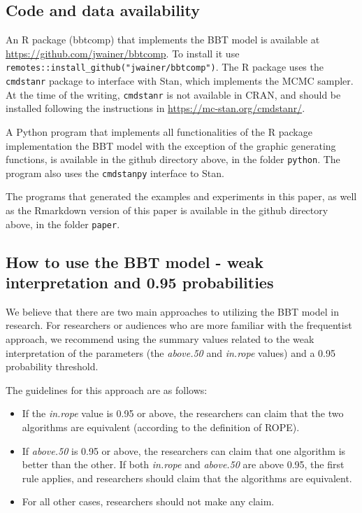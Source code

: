 \documentclass[twoside,11pt,preprint]{article}
\begin{document}
\hypertarget{code-and-data-availability}{%
\subsection{\texorpdfstring{Code and data availability \label{sec:code}}{Code and data availability }}\label{code-and-data-availability}}

An R package (bbtcomp) that implements the BBT model is available at
\url{https://github.com/jwainer/bbtcomp}. To install it use
\texttt{remotes::install\_github("jwainer/bbtcomp")}. The R package uses the
\texttt{cmdstanr} package to interface with Stan, which implements the MCMC
sampler. At the time of the writing, \texttt{cmdstanr} is not available in
CRAN, and should be installed following the instructions in
\url{https://mc-stan.org/cmdstanr/}.

A Python program that implements all functionalities of the R package
implementation the BBT model with the exception of the graphic
generating functions, is available in the github directory above, in
the folder \texttt{python}. The program also uses the \texttt{cmdstanpy} interface to Stan.

The programs that generated the examples and experiments in this paper, as
well as the Rmarkdown version of this paper is available in the github
directory above, in the folder \texttt{paper}.

\hypertarget{how-to-use-the-bbt-model---weak-interpretation-and-0.95-probabilities}{%
\subsection{How to use the BBT model - weak interpretation and 0.95 probabilities}\label{how-to-use-the-bbt-model---weak-interpretation-and-0.95-probabilities}}

We believe that there are two main approaches to utilizing the BBT model in research. For researchers or audiences who are more familiar with the frequentist approach, we recommend using the summary values related to the weak interpretation of the parameters (the {\em above.50} and {\em in.rope} values) and a 0.95 probability threshold.

The guidelines for this approach are as follows:

\begin{itemize}
\item
  If the {\em in.rope} value is 0.95 or above, the researchers can claim that the two algorithms are equivalent (according to the definition of ROPE).
\item
  If {\em above.50} is 0.95 or above, the researchers can claim that one algorithm is better than the other. If both {\em in.rope} and {\em above.50} are above 0.95, the first rule applies, and researchers should claim that the algorithms are equivalent.
\item
  For all other cases, researchers should not make any claim.
\end{itemize}
\end{document}

